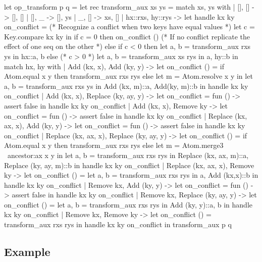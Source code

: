 \documentclass{article}
\begin{document}
\begin{longlisting}
let op_transform p q = 
  let rec transform_aux xs ys =
    match xs, ys with
    | [], [] -> [], []
    | [], _ -> [], ys
    | _, [] -> xs, []   
    | hx::rxs, hy::rys ->
      let handle kx ky on_conflict =
        (* Recognize a conflict when two keys have equal values *)
        let c = Key.compare kx ky in
        if c = 0 then on_conflict ()
        (* If no conflict replicate the effect of one seq on the other  *)
        else if c < 0 then 
          let a, b = transform_aux rxs ys in
          hx::a, b
        else (* c > 0 *)
          let a, b = transform_aux xs rys in
          a, hy::b in
      match hx, hy with
      | Add (kx, x), Add (ky, y) ->
        let on_conflict () =
          if Atom.equal x y then
            transform_aux rxs rys
          else
            let m = Atom.resolve x y in
            let a, b = transform_aux rxs ys in
            Add (kx, m)::a, Add(ky, m)::b in
        handle kx ky on_conflict
      | Add (kx, x), Replace (ky, ay, y) ->
        let on_conflict = fun () -> assert false in
        handle kx ky on_conflict
      | Add (kx, x), Remove ky ->
        let on_conflict = fun () -> assert false in
        handle kx ky on_conflict
      | Replace (kx, ax, x), Add (ky, y) ->
        let on_conflict = fun () -> assert false in
        handle kx ky on_conflict
      | Replace (kx, ax, x), Replace (ky, ay, y) ->
        let on_conflict () =
          if Atom.equal x y then
            transform_aux rxs rys
          else
            let m = Atom.merge3 ~ancestor:ax x y in
            let a, b = transform_aux rxs rys in
            Replace (kx, ax, m)::a, Replace (ky, ay, m)::b in
        handle kx ky on_conflict
      | Replace (kx, ax, x), Remove ky ->
        let on_conflict () =
          let a, b = transform_aux rxs rys in
          a, Add (kx,x)::b in
        handle kx ky on_conflict
      | Remove kx, Add (ky, y) ->
        let on_conflict = fun () -> assert false in
        handle kx ky on_conflict
      | Remove kx, Replace (ky, ay, y) ->
        let on_conflict () =
          let a, b = transform_aux rxs rys in
          Add (ky, y)::a, b in
        handle kx ky on_conflict
      | Remove kx, Remove ky ->
        let on_conflict () = transform_aux rxs rys in
        handle kx ky on_conflict
  in
  transform_aux p q
\end{longlisting}

\subsection{Example}\label{map-example}
\end{document}
